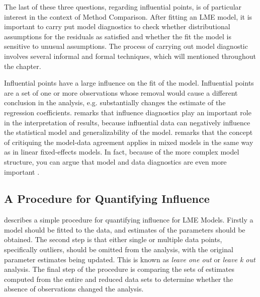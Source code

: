 \documentclass[12pt, a4paper]{report}
\theoremstyle{plain}
\theoremstyle{definition}
\theoremstyle{remark}
\begin{document}
	The last of these three questions, regarding influential points, is of particular interest in the context of Method Comparison. After fitting an LME model, it is important to carry put model diagnostics to check whether distributional assumptions for the
	residuals as satisfied and whether the fit the model is sensitive to unusual assumptions. The process of carrying out model
	diagnostic involves several informal and formal techniques, which will mentioned throughout the chapter.
	
	Influential points have a large influence on the fit of the model. Influential points are a set of one or more observations whose removal would cause a different conclusion in the analysis, e.g. substantially changes the estimate of the regression coefficients. \citet{west} remarks that influence diagnostics play an important role in the interpretation of results, because influential data can negatively 
	influence the statistical model and generalizability of the model.
	\citet{schabenberger} remarks that the concept of critiquing the model-data agreement applies in mixed models in the same way as in linear
	fixed-effects models. In fact, because of the more complex model structure, you can argue that model and
	data diagnostics are even more important \citep{west}.
	
	
	\subsection{A Procedure for Quantifying Influence}  
	
	\citet{schabenberger} describes a simple procedure for quantifying influence for LME Models. Firstly a model should be fitted to the data, and
	estimates of the parameters should be obtained. The second step is that either single or multiple data points, specifically outliers,
	should be omitted from the analysis, with the original parameter estimates being updated. This is known as \textit{leave one out} or \textit{leave k out} analysis. The final step of the procedure is comparing the sets of estimates computed from the entire and reduced data sets to determine whether the absence of observations changed the
	analysis. 
	
\end{document}
